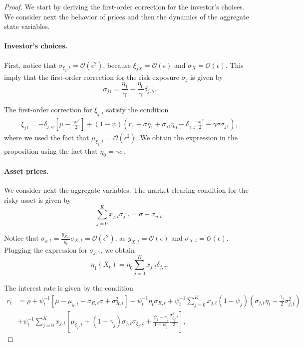 \documentclass[11pt,english]{article}
\begin{document}
\begin{proof}
We start by deriving the first-order correction for the investor's choices. We consider next the behavior of prices and then the dynamics of the aggregate state variables.
\paragraph{Investor's choices.} First, notice that $\sigma_{\xi_j,t} = \mathcal{O}(\epsilon^2)$, because $\xi_{jX} = \mathcal{O}(\epsilon)$ and $\sigma_X = \mathcal{O}(\epsilon)$. This imply that the first-order correction for the risk exposure $\sigma_j$ is given by
\begin{equation*}
    \sigma_{j1} = \frac{\eta_1}{\gamma} - \frac{\eta_0}{\gamma} \delta_{j,\gamma}.
\end{equation*}

The first-order correction for $\xi_{j,t}$ satisfy the condition
\begin{align*}
    \xi_{j1} = -\delta_{j,\psi} \left[\mu - \frac{\gamma\sigma^2}{2} \right]+(1-\psi) \left(r_1 + \sigma \eta_1 + \sigma_{j1} \eta_0 - \delta_{\gamma,j} \frac{\gamma\sigma^2}{2} - \gamma \sigma \sigma_{j1}\right),
\end{align*}
where we used the fact that $\mu_{\xi_j,t}=\mathcal{O}(\epsilon^2)$. We obtain the expression in the proposition using the fact that $\eta_0 = \gamma \sigma$.

\paragraph{Asset prices.} We consider next the aggregate variables. The market clearing condition for the risky asset is given by
\begin{equation*}
    \sum_{j=0}^K x_{j,t} \sigma_{j,t} = \sigma -  \sigma_{y,t}.
\end{equation*}

Notice that $\sigma_{y,t} = \frac{y_{X,t}}{y_t} \sigma_{X,t} = \mathcal{O}(\epsilon^2)$, as $y_{X,t} = \mathcal{O}(\epsilon)$ and $\sigma_{X,t} = \mathcal{O}(\epsilon)$. Plugging the expression for $\sigma_{j,1}$, we obtain
\begin{equation*}
    \eta_1(X_t) = \eta_0 \sum_{j=0}^K x_{j,t} \delta_{j,\gamma}.
\end{equation*}

The interest rate is given by the condition
\begin{align}
    r_t &= \rho + \psi_t^{-1} \left[ \mu - \mu_{y,t} - \sigma_{R,t} \sigma  + \sigma_{R,t}^2\right] - \psi_t^{-1}\eta_t \sigma_{R,t} + \psi_t^{-1}\sum_{j=0}^K x_{j,t}   (1-\psi_j) \left( \sigma_{j,t} \eta_t - \frac{\gamma_j}{2}  \sigma_{j,t}^2    \right)  \nonumber\\
    &+ \psi_t^{-1}\sum_{j=0}^K x_{j,t} \left[ \mu_{\xi_j,t} 
    + (1-\gamma_j) \sigma_{j,t} \sigma_{\xi_j,t}
    + \frac{\psi_j - \gamma_j}{1-\psi_j} \frac{\sigma_{\xi_j,t}^2}{2} \right],
\end{align}


\end{proof}
\end{document}

